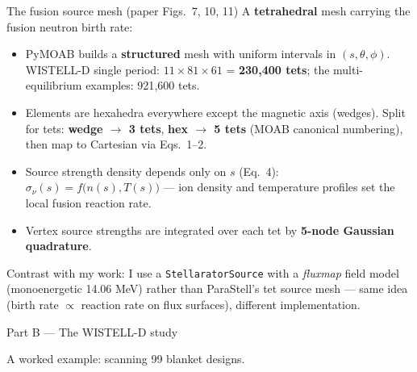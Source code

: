 \documentclass[aspectratio=169]{beamer}
\newcommand{\wb}[1]{\begin{tcolorbox}[colback=warn!5,colframe=warn!55,boxsep=2pt,left=4pt,right=4pt,top=3pt,bottom=3pt]#1\end{tcolorbox}}
\begin{document}
\begin{frame}{The fusion source mesh (paper Figs.~7, 10, 11)}
  A \textbf{tetrahedral} mesh carrying the fusion neutron birth rate:
  \begin{itemize}
    \item PyMOAB builds a \textbf{structured} mesh with uniform intervals in $(s,\theta,\phi)$. WISTELL-D single period: $11\times81\times61$ = \textbf{230{,}400 tets}; the multi-equilibrium examples: 921{,}600 tets.
    \item Elements are hexahedra everywhere except the magnetic axis (wedges). Split for tets: \textbf{wedge $\to$ 3 tets}, \textbf{hex $\to$ 5 tets} (MOAB canonical numbering), then map to Cartesian via Eqs.~1--2.
    \item Source strength density depends only on $s$ (Eq.~4): $\sigma_\nu(s) = f\big(n(s),T(s)\big)$ --- ion density and temperature profiles set the local fusion reaction rate.
    \item Vertex source strengths are integrated over each tet by \textbf{5-node Gaussian quadrature}.
  \end{itemize}
  \wb{\footnotesize Contrast with my work: I use a \texttt{StellaratorSource} with a \emph{fluxmap} field model (monoenergetic 14.06 MeV) rather than ParaStell's tet source mesh --- same idea (birth rate $\propto$ reaction rate on flux surfaces), different implementation.}
\end{frame}

\begin{frame}{Part B --- The WISTELL-D study}
  \begin{center}\Large\color{key} A worked example: scanning 99 blanket designs.\end{center}
\end{frame}
\end{document}
